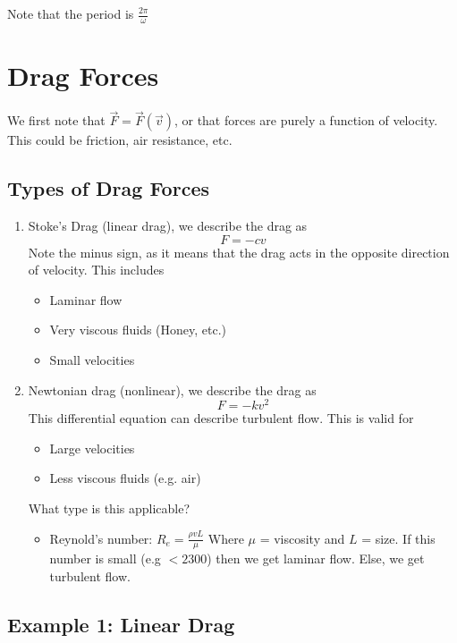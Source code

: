 \documentclass{article}
\newtheorem{one minute paper}[theorem]{One Minute Paper}
\begin{document}
Note that the period is $\frac{2\pi}{\omega}$

\newpage 

\section*{Drag Forces}

We first note that $\vec{F} = \vec{F}\left(\vec{v}\right)$, or that forces are purely a function of velocity. This could be friction, air resistance, etc. 

\subsection*{Types of Drag Forces}
\begin{enumerate}
    \item Stoke's Drag (linear drag), we describe the drag as 
    \begin{equation}
        F = -cv
    \end{equation}
    Note the minus sign, as it means that the drag acts in the opposite direction of velocity. This includes
    \begin{itemize}
        \item Laminar flow
        \item Very viscous fluids (Honey, etc.)
        \item Small velocities
    \end{itemize}
    \item Newtonian drag (nonlinear), we describe the drag as 
    \begin{equation}
        F = -k v^2
    \end{equation}
    This differential equation can describe turbulent flow. This is valid for 
    \begin{itemize}
        \item Large velocities
        \item Less viscous fluids (e.g. air)
    \end{itemize}
    What type is this applicable?
    \begin{itemize}
        \item Reynold's number: $R_e = \frac{\rho v L}{\mu}$ Where $\mu$ = viscosity and $L$ = size. If this number
        is small (e.g $< 2300$) then we get laminar flow. Else, we get turbulent flow. 
    \end{itemize}
\end{enumerate}

\subsection*{Example 1: Linear Drag}
\end{document}

